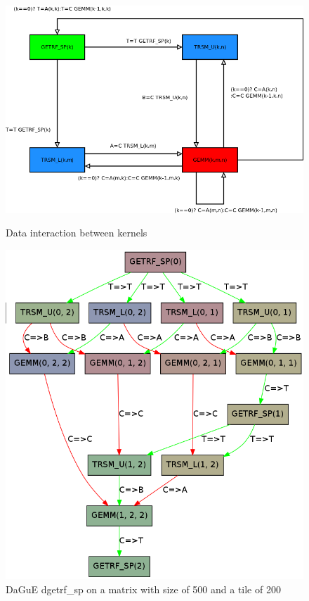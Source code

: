 \documentclass{report}
\begin{document}
\begin{figure}[!h]
\begin{minipage}[!h]{.5\linewidth}
\centering
\includegraphics[width=\textwidth]{dag_getrf_sp.png}
\caption{Data interaction between kernels}
\end{minipage} \hfill
\begin{minipage}[!h]{.5\linewidth}
\includegraphics[width=\textwidth]{dag.png}
\caption{DaGuE dgetrf\_sp on a matrix with size of 500 and a tile of 200}
\end{minipage}
\end{figure}
\end{document}

